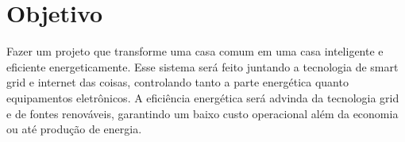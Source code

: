 \chapter[Objetivo]{Objetivo}

    \par Fazer um projeto que transforme uma casa comum em uma casa inteligente e eficiente energeticamente. Esse sistema será feito juntando a tecnologia de smart grid e internet das coisas, controlando tanto a parte  energética quanto  equipamentos eletrônicos. A eficiência energética será advinda da  tecnologia grid e de fontes renováveis, garantindo um baixo custo operacional além da economia ou até produção de energia.